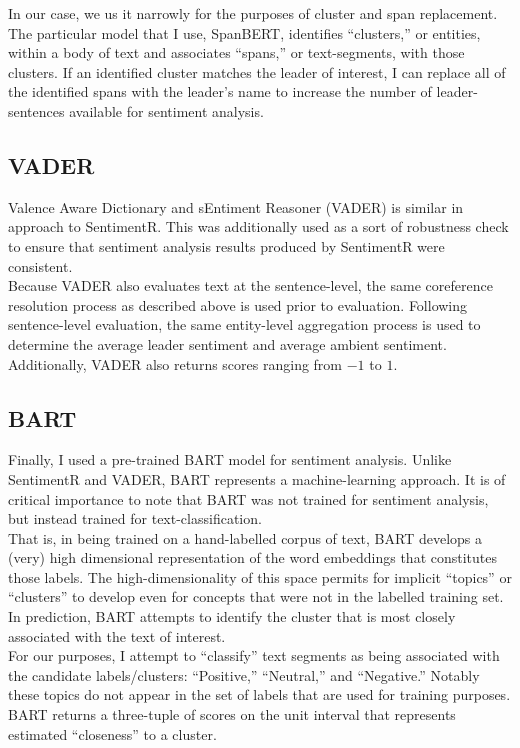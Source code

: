 \documentclass[11pt, letterpaper, twoside]{article}
\begin{document}
    In our case, we us it narrowly for the purposes of cluster and span replacement. The particular model that I use, SpanBERT, identifies ``clusters,'' or entities, within a body of text and associates ``spans,'' or text-segments, with those clusters. If an identified cluster matches the leader of interest, I can replace all of the identified spans with the leader's name to increase the number of leader-sentences available for sentiment analysis.\\
    
\subsection{VADER}
    Valence Aware Dictionary and sEntiment Reasoner (VADER) is similar in approach to SentimentR. This was additionally used as a sort of robustness check to ensure that sentiment analysis results produced by SentimentR were consistent.\\

    Because VADER also evaluates text at the sentence-level, the same coreference resolution process as described above is used prior to evaluation. Following sentence-level evaluation, the same entity-level aggregation process is used to determine the average leader sentiment and average ambient sentiment. Additionally, VADER also returns scores ranging from $-1$ to $1$.
    
\subsection{BART}
    Finally, I used a pre-trained BART model for sentiment analysis. Unlike SentimentR and VADER, BART represents a machine-learning approach. It is of critical importance to note that BART was not trained for sentiment analysis, but instead trained for text-classification.\\

    That is, in being trained on a hand-labelled corpus of text, BART develops a (very) high dimensional representation of the word embeddings that constitutes those labels. The high-dimensionality of this space permits for implicit ``topics'' or ``clusters'' to develop even for concepts that were not in the labelled training set. In prediction, BART attempts to identify the cluster that is most closely associated with the text of interest.\\

    For our purposes, I attempt to ``classify'' text segments as being associated with the candidate labels/clusters: ``Positive,'' ``Neutral,'' and ``Negative.'' Notably these topics do not appear in the set of labels that are used for training purposes. BART returns a three-tuple of scores on the unit interval that represents estimated ``closeness'' to a cluster.\\
\end{document}
